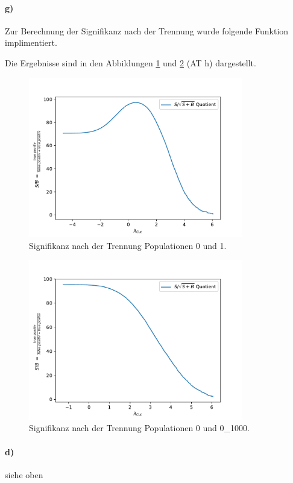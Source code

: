 \paragraph{g)}
Zur Berechnung der Signifikanz nach der Trennung wurde folgende Funktion implimentiert.

Die Ergebnisse sind in den Abbildungen \ref{fig:S1} und \ref{fig:S2} (AT h) dargestellt.
\begin{figure}
  \centering
  \includegraphics[height = 7cm]{plots/Signifikanzplot.pdf}
  \caption{Signifikanz nach der Trennung Populationen 0 und 1.}
  \label{fig:S1}
\end{figure}
\begin{figure}
  \centering
  \includegraphics[height = 7cm]{plots/2Signifikanzplot.pdf}
  \caption{Signifikanz nach der Trennung Populationen 0 und 0\_1000.}
  \label{fig:S2}
\end{figure}
\FloatBarrier
\paragraph{d)} siehe oben
